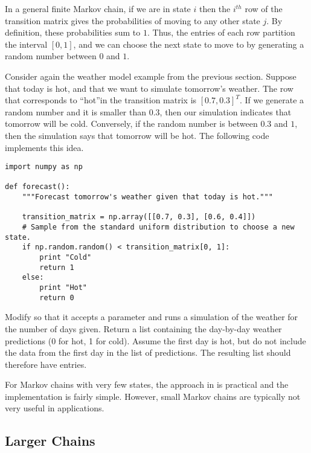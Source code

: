 In a general finite Markov chain, if we are in state $i$ then the $i^{th}$ row of the transition matrix gives the probabilities of moving to any other state $j$.
By definition, these probabilities sum to $1$.
Thus, the entries of each row partition the interval $[0, 1]$, and we can choose the next state to move to by generating a random number between $0$ and $1$.

Consider again the weather model example from the previous section.
Suppose that today is hot, and that we want to simulate tomorrow's weather.
The row that corresponds to ``hot''in the transition matrix is $[0.7, 0.3]^T$.
If we generate a random number and it is smaller than $0.3$, then our simulation indicates that tomorrow will be cold.
Conversely, if the random number is between $0.3$ and $1$, then the simulation says that tomorrow will be hot.
The following code implements this idea.

\begin{lstlisting}
import numpy as np

def forecast():
	"""Forecast tomorrow's weather given that today is hot."""

	transition_matrix = np.array([[0.7, 0.3], [0.6, 0.4]])
	# Sample from the standard uniform distribution to choose a new state.
	if np.random.random() < transition_matrix[0, 1]:
		print "Cold"
		return 1
	else:
		print "Hot"
		return 0
\end{lstlisting}

\begin{problem} %
Modify  so that it accepts a parameter  and runs a simulation of the weather for the number of days given.
Return a list containing the day-by-day weather predictions (0 for hot, 1 for cold).
Assume the first day is hot, but do not include the data from the first day in the list of predictions.
The resulting list should therefore have  entries.
\end{problem}

For Markov chains with very few states, the approach in  is practical and the implementation is fairly simple.
However, small Markov chains are typically not very useful in applications.

\subsection*{Larger Chains} %

